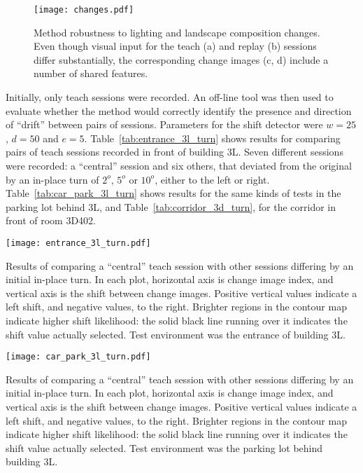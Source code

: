 \documentclass[twocolumn, 9pt,fleqn]{jsproceedings}
\begin{document}
\begin{figure}[h!]
\centering
\texttt{[image: changes.pdf]}
\caption{Method robustness to lighting and landscape composition changes. Even though visual input for the teach (a) and replay (b) sessions differ substantially, the corresponding change images (c, d) include a number of shared features.}
\label{fig:changes}
\end{figure}

Initially, only teach sessions were recorded. An off-line tool was then used to evaluate whether the method would correctly identify the presence and direction of ``drift'' between pairs of sessions. Parameters for the shift detector were $w = 25$, $d = 50$ and $e = 5$. Table~\ref{tab:entrance_3l_turn} shows results for comparing pairs of teach sessions recorded in front of building 3L. Seven different sessions were recorded: a ``central'' session and six others, that deviated from the original by an in-place turn of $2^o$, $5^o$ or $10^o$, either to the left or right. Table~\ref{tab:car_park_3l_turn} shows results for the same kinds of tests in the parking lot behind 3L, and Table~\ref{tab:corridor_3d_turn}, for the corridor in front of room 3D402.

\begin{table*}[h!]
\texttt{[image: entrance\_3l\_turn.pdf]}
\caption{Results of comparing a ``central'' teach session with other sessions differing by an initial in-place turn. In each plot, horizontal axis is change image index, and vertical axis is the shift between change images. Positive vertical values indicate a left shift, and negative values, to the right. Brighter regions in the contour map indicate higher shift likelihood: the solid black line running over it indicates the shift value actually selected. Test environment was the entrance of building 3L.}
\label{tab:entrance_3l_turn}
\end{table*}

\clearpage

\begin{table*}[h!]
\texttt{[image: car\_park\_3l\_turn.pdf]}
\caption{Results of comparing a ``central'' teach session with other sessions differing by an initial in-place turn. In each plot, horizontal axis is change image index, and vertical axis is the shift between change images. Positive vertical values indicate a left shift, and negative values, to the right. Brighter regions in the contour map indicate higher shift likelihood: the solid black line running over it indicates the shift value actually selected. Test environment was the parking lot behind building 3L.}
\label{tab:car_park_3l_turn}
\end{table*}
\end{document}

